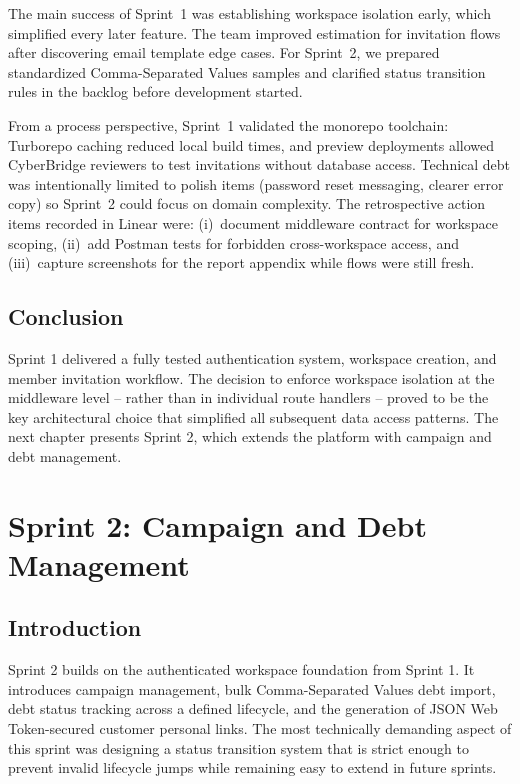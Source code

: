 \documentclass[12pt,a4paper]{report}
\begin{document}
The main success of Sprint~1 was establishing workspace isolation early, which simplified every
later feature.
The team improved estimation for invitation flows after discovering email template edge cases.
For Sprint~2, we prepared standardized Comma-Separated Values samples and clarified status
transition rules in the backlog before development started.

From a process perspective, Sprint~1 validated the monorepo toolchain: Turborepo caching reduced
local build times, and preview deployments allowed CyberBridge reviewers to test invitations without
database access.
Technical debt was intentionally limited to polish items (password reset messaging, clearer error
copy) so Sprint~2 could focus on domain complexity.
The retrospective action items recorded in Linear were: (i)~document middleware contract for
workspace scoping, (ii)~add Postman tests for forbidden cross-workspace access, and
(iii)~capture screenshots for the report appendix while flows were still fresh.

\section*{Conclusion}
{}

Sprint 1 delivered a fully tested authentication system, workspace creation, and
member invitation workflow.
The decision to enforce workspace isolation at the middleware level -- rather than
in individual route handlers -- proved to be the key architectural choice that
simplified all subsequent data access patterns.
The next chapter presents Sprint 2, which extends the platform with campaign and
debt management.

\clearpage
\chapter{Sprint 2: Campaign and Debt Management}
\label{chap:sprint2}

\section*{Introduction}
{}

Sprint 2 builds on the authenticated workspace foundation from Sprint 1.
It introduces campaign management, bulk Comma-Separated Values debt import, debt status tracking across
a defined lifecycle, and the generation of JSON Web Token-secured customer personal links.
The most technically demanding aspect of this sprint was designing a status
transition system that is strict enough to prevent invalid lifecycle jumps while
remaining easy to extend in future sprints.
\end{document}
